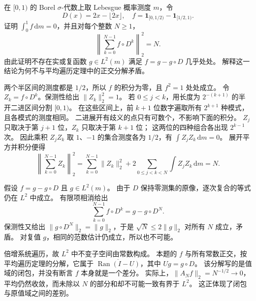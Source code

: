 \begin{exercise}[零平均与差分表示]\label{b1:ex:32-zero-mean-not-difference}
在 \([0,1)\) 的 Borel \(\sigma\)-代数上取 Lebesgue 概率测度 \(m\)，令
\[
 D(x)=2x-\lfloor2x\rfloor,
 \quad f=\mathbf1_{[0,1/2)}-\mathbf1_{[1/2,1)}.
\]
证明 \(\int_0^1 f\,\mathrm dm=0\)，并且对每个整数 \(N\geq1\)，
\[
 \left\|\sum_{k=0}^{N-1}f\circ D^k\right\|_2^2=N.
\]
由此证明不存在实或复函数 \(g\in L^2(m)\) 满足
\(f=g-g\circ D\) 几乎处处。
解释这一结论为何不与平均遍历定理中的正交分解矛盾。
\end{exercise}
\begin{solution}
两个半区间的测度都是 \(1/2\)，所以 \(f\) 的积分为零，且 \(f^2=1\) 处处成立。
令 \(Z_k=f\circ D^k\)。保测性给出 \(\|Z_k\|_2^2=1\)。
若 \(0\leq j<k\)，用长度为 \(2^{-(k+1)}\) 的半开二进区间分割 \([0,1)\)。
在这些区间上，前 \(k+1\) 位数字遍取所有 \(2^{k+1}\) 种模式，且各模式的测度相同。
二进展开有歧义的点只有可数个，不影响下面的积分。
\(Z_j\) 只取决于第 \(j+1\) 位，\(Z_k\) 只取决于第 \(k+1\) 位；
这两位的四种组合各出现 \(2^{k-1}\) 次。
因此乘积 \(Z_jZ_k\) 取 \(1\)、\(-1\) 的集合测度各为 \(1/2\)，有
\(\int Z_jZ_k\,\mathrm dm=0\)。
展开平方并积分便得
\[
 \left\|\sum_{k=0}^{N-1}Z_k\right\|_2^2
 =\sum_{k=0}^{N-1}\|Z_k\|_2^2
  +2\sum_{0\leq j<k<N}\int Z_jZ_k\,\mathrm dm=N.
\]

假设 \(f=g-g\circ D\) 且 \(g\in L^2(m)\)。
由于 \(D\) 保持零测集的原像，逐次复合的等式仍在 \(L^2\) 中成立。
有限项相消给出
\[
 \sum_{k=0}^{N-1}f\circ D^k=g-g\circ D^N.
\]
保测性又给出 \(\|g\circ D^N\|_2=\|g\|_2\)，于是
\(\sqrt N\leq2\|g\|_2\) 对所有 \(N\) 成立，矛盾。
对复值 \(g\)，相同的范数估计仍成立，所以也不可能。

倍增系统遍历，故 \(L^2\) 中不变子空间由常数构成。
本题的 \(f\) 与所有常数正交，按平均遍历定理的分解，它属于
\(\overline{\operatorname{Ran}(I-U)}\)，其中 \(Ug=g\circ D\)。
该分解写的是值域的闭包，并没有断言 \(f\) 本身就是一个差分。
实际上，\(\|A_Nf\|_2=N^{-1/2}\to0\)，
平均仍然收敛，而未除以 \(N\) 的部分和却不可能一致有界于 \(L^2\)。
这正体现了闭包与原值域之间的差别。
\end{solution}

